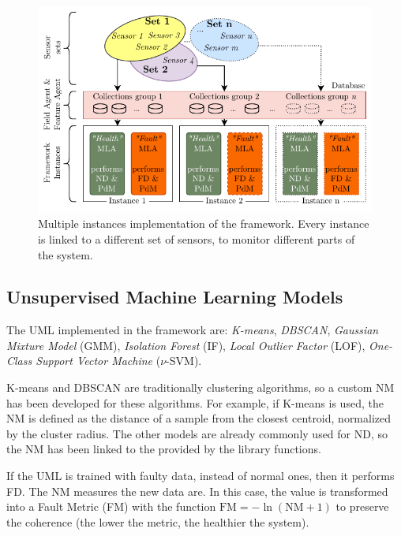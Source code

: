 \begin{figure}
    \includegraphics[width=\linewidth]{images/FrameworkInstances.pdf}
    \caption{Multiple instances implementation of the framework. Every instance is linked to a different set of sensors, to monitor different parts of the system.}
    \label{fig:multiple_instances}
\end{figure}


\subsection{Unsupervised Machine Learning Models}

The UML implemented in the framework are: \emph{K-means}, \emph{DBSCAN}, \emph{Gaussian Mixture Model} (GMM), \emph{Isolation Forest} (IF), \emph{Local Outlier Factor} (LOF), \emph{One-Class Support Vector Machine} ($\nu$-SVM).

K-means and DBSCAN are traditionally clustering algorithms, so a custom NM has been developed for these algorithms. For example, if K-means is used, the NM is defined as the distance of a sample from the closest centroid, normalized by the cluster radius. The other models are already commonly used for ND, so the NM has been linked to the  provided by the library functions.

If the UML is trained with faulty data, instead of normal ones, then it performs FD. The NM measures  the new data are. In this case, the value is transformed into a Fault Metric (FM) with the function $\text{FM} = - \ln(\text{NM} + 1)$ to preserve the coherence (the lower the metric, the healthier the system). 